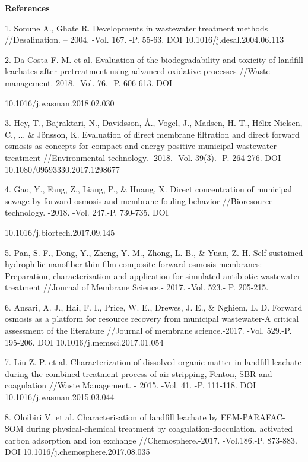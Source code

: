 \begin{center}
{\bfseries References}
\end{center}


\begin{noparindent}
1.
  Sonune A., Ghate R. Developments in wastewater treatment methods
  //Desalination. -- 2004. -Vol. 167. -P. 55-63. DOI
  10.1016/j.desal.2004.06.113

2.
  Da Costa F. M. et al. Evaluation of the biodegradability and toxicity
  of landfill leachates after pretreatment using advanced oxidative
  processes //Waste management.-2018. -Vol. 76.- P. 606-613. DOI

  10.1016/j.wasman.2018.02.030

3.
  Hey, T., Bajraktari, N., Davidsson, Å., Vogel, J., Madsen, H. T.,
  Hélix-Nielsen, C., ... \& Jönsson, K. Evaluation of direct membrane
  filtration and direct forward osmosis as concepts for compact and
  energy-positive municipal wastewater treatment //Environmental
  technology.- 2018. -Vol. 39(3).- P. 264-276. DOI
  10.1080/09593330.2017.1298677

4.
  Gao, Y., Fang, Z., Liang, P., \& Huang, X. Direct concentration of
  municipal sewage by forward osmosis and membrane fouling behavior
  //Bioresource technology. -2018. -Vol. 247.-P. 730-735. DOI

  10.1016/j.biortech.2017.09.145

5.
  Pan, S. F., Dong, Y., Zheng, Y. M., Zhong, L. B., \& Yuan, Z. H.
  Self-sustained hydrophilic nanofiber thin film composite forward
  osmosis membranes: Preparation, characterization and application for
  simulated antibiotic wastewater treatment //Journal of Membrane
  Science.- 2017. -Vol. 523.- P. 205-215.

6.
  Ansari, A. J., Hai, F. I., Price, W. E., Drewes, J. E., \& Nghiem, L.
  D. Forward osmosis as a platform for resource recovery from municipal
  wastewater-A critical assessment of the literature //Journal of
  membrane science.-2017. -Vol. 529.-P. 195-206. DOI
  10.1016/j.memsci.2017.01.054

7.
  Liu Z. P. et al. Characterization of dissolved organic matter in
  landfill leachate during the combined treatment process of air
  stripping, Fenton, SBR and coagulation //Waste Management. - 2015.
  -Vol. 41. -P. 111-118. DOI 10.1016/j.wasman.2015.03.044

8.
  Oloibiri V. et al. Characterisation of landfill leachate by
  EEM-PARAFAC-SOM during physical-chemical treatment by
  coagulation-flocculation, activated carbon adsorption and ion exchange
  //Chemosphere.-2017. -Vol.186.-P. 873-883. DOI
  10.1016/j.chemosphere.2017.08.035


\end{noparindent}
